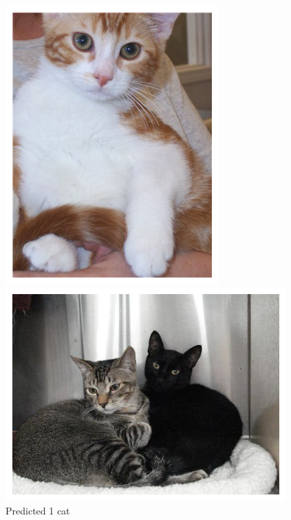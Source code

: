 \documentclass{article}
\begin{document}
\begin{figure}[h!]
    \centering
    \begin{minipage}[b]{0.3\textwidth}
        \centering
        \includegraphics[width=\textwidth]{figs/3.4_ex1.png}
        \caption{Predicted 1 cat}
        \label{fig:1cat}
    \end{minipage}
    \hfill
    \begin{minipage}[b]{0.3\textwidth}
        \centering
        \includegraphics[width=\textwidth]{figs/3.4_ex2.png}

\end{minipage}
\end{figure}
\end{document}
